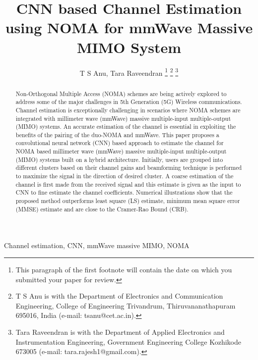 \documentclass[journal]{IEEEtran}
\begin{document}
\title{CNN based Channel Estimation using NOMA for mmWave Massive MIMO System }

\author{T S Anu, Tara Raveendran
\thanks{This paragraph of the first footnote will contain the date on which you submitted your paper for review. }
\thanks{T S Anu is with the Department of Electronics and Communication Engineering, College of Engineering Trivandrum, Thiruvananathapuram 695016, India (e-mail: tsanu@cet.ac.in).}
\thanks{Tara Raveendran is with the Department of Applied Electronics and Instrumentation Engineering, Government Engineering College Kozhikode 673005 (e-mail: tara.rajesh1@gmail.com).}}

\maketitle

\begin{abstract}
Non-Orthogonal Multiple Access (NOMA) schemes are being actively explored to address some of the major challenges in 5th Generation (5G) Wireless communications. Channel estimation is exceptionally challenging in scenarios where NOMA schemes are integrated with millimeter wave (mmWave) massive multiple-input multiple-output (MIMO) systems.  An accurate estimation of the channel is essential in exploiting the benefits of the pairing of the duo-NOMA and mmWave. This paper proposes a convolutional neural network (CNN) based approach to estimate the channel for NOMA based millimeter wave (mmWave) massive multiple-input multiple-output (MIMO) systems built on a hybrid architecture. Initially, users are grouped into different clusters based on their channel gains and beamforming technique is performed to maximize the signal in the direction of desired cluster. A coarse estimation of the channel is first made from the received signal and this estimate is given as the input to CNN to fine estimate the channel coefficients. Numerical illustrations show that the proposed method outperforms least square (LS) estimate, minimum mean square error (MMSE) estimate and are close to the Cramer-Rao Bound (CRB).
\end{abstract}

\begin{IEEEkeywords}
Channel estimation, CNN, mmWave massive MIMO, NOMA
\end{IEEEkeywords}
\end{document}
